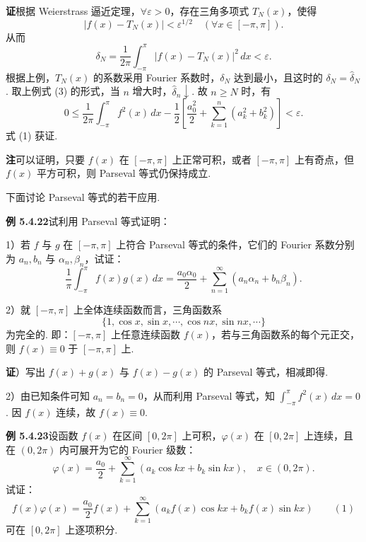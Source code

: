 \documentclass[UTF8,12pt,a4paper,fontset=fandol]{ctexart}
\begin{document}
\noindent\textbf{证}\quad 根据 Weierstrass 逼近定理，$\forall\varepsilon>0$，存在三角多项式
$T_N(x)$，使得
\[
  |f(x)-T_N(x)|<\varepsilon^{1/2}\quad(\forall x\in[-\pi,\pi]).
\]
从而
\[
  \delta_N=\frac1{2\pi}\int_{-\pi}^{\pi}|f(x)-T_N(x)|^2\,dx<\varepsilon.
\]
根据上例，$T_N(x)$ 的系数采用 Fourier 系数时，$\delta_N$ 达到最小，且这时的
$\delta_N=\hat\delta_N$. 取上例式 (3) 的形式，当 $n$ 增大时，$\hat\delta_n\downarrow$. 故 $n\ge N$ 时，有
\[
  0\le\frac1{2\pi}\int_{-\pi}^{\pi}f^2(x)\,dx
  -\frac12\left[\frac{a_0^2}{2}+\sum_{k=1}^{n}(a_k^2+b_k^2)\right]<\varepsilon.
\]
式 (1) 获证.

\noindent\textbf{注}\quad 可以证明，只要 $f(x)$ 在 $[-\pi,\pi]$ 上正常可积，或者 $[-\pi,\pi]$ 上有奇点，但
$f(x)$ 平方可积，则 Parseval 等式仍保持成立.

下面讨论 Parseval 等式的若干应用.

\noindent\textbf{例 5.4.22}\quad 试利用 Parseval 等式证明：

1）若 $f$ 与 $g$ 在 $[-\pi,\pi]$ 上符合 Parseval 等式的条件，它们的 Fourier 系数分别为
$a_n,b_n$ 与 $\alpha_n,\beta_n$，试证：
\[
  \frac1\pi\int_{-\pi}^{\pi}f(x)g(x)\,dx
  =\frac{a_0\alpha_0}{2}+\sum_{n=1}^{\infty}(a_n\alpha_n+b_n\beta_n).
\]

2）就 $[-\pi,\pi]$ 上全体连续函数而言，三角函数系
\[
  \{1,\cos x,\sin x,\cdots,\cos nx,\sin nx,\cdots\}
\]
为完全的. 即：$[-\pi,\pi]$ 上任意连续函数 $f(x)$，若与三角函数系的每个元正交，则
$f(x)\equiv0$ 于 $[-\pi,\pi]$ 上.

\noindent\textbf{证}）写出 $f(x)+g(x)$ 与 $f(x)-g(x)$ 的 Parseval 等式，相减即得.

2）由已知条件可知 $a_n=b_n=0$，从而利用 Parseval 等式，知
$\displaystyle\int_{-\pi}^{\pi}f^2(x)\,dx=0$. 因 $f(x)$ 连续，故 $f(x)\equiv0$.

\noindent\textbf{例 5.4.23}\quad 设函数 $f(x)$ 在区间 $[0,2\pi]$ 上可积，$\varphi(x)$ 在 $[0,2\pi]$ 上连续，且在
$(0,2\pi)$ 内可展开为它的 Fourier 级数：
\[
  \varphi(x)=\frac{a_0}{2}+\sum_{k=1}^{\infty}(a_k\cos kx+b_k\sin kx),\quad x\in(0,2\pi).
\]
试证：
\[
  f(x)\varphi(x)=\frac{a_0}{2}f(x)+
  \sum_{k=1}^{\infty}(a_kf(x)\cos kx+b_kf(x)\sin kx) \qquad(1)
\]
可在 $[0,2\pi]$ 上逐项积分.
\end{document}
